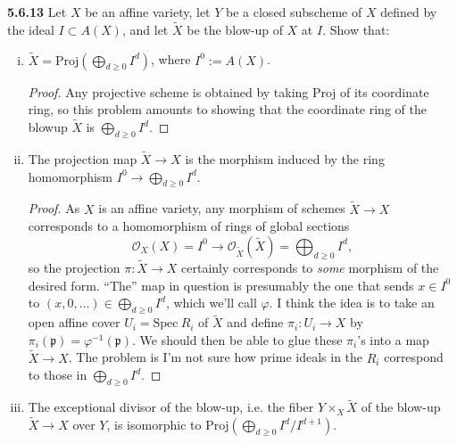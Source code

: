 \documentclass[11pt,letterpaper]{report}
\newcommand{\mcal}[1]{\mathcal{#1}}
\newcommand{\Spec}{\text{Spec}}
\newcommand{\Proj}{\text{Proj}}
\begin{document}
\noindent\textbf{5.6.13}
Let $X$ be an affine variety, let $Y$ be a closed subscheme of $X$ defined by the ideal $I\subset A(X)$, and let $\tilde{X}$ be the blow-up of $X$ at $I$. Show that:
\begin{enumerate}[(i)]
	\item $\tilde{X} = \Proj(\bigoplus_{d\geq 0}I^d)$, where $I^{0}:= A(X)$.
	\begin{proof}
		Any projective scheme is obtained by taking $\Proj$ of its coordinate ring, so this problem amounts to showing that the coordinate ring of the blowup $\tilde{X}$ is $\bigoplus_{d\geq 0}I^d$.
	\end{proof}
	\item The projection map $\tilde{X}\to X$ is the morphism induced by the ring homomorphism $I^{0}\to \bigoplus_{d\geq 0}I^{d}$.
	\begin{proof}
		As $X$ is an affine variety, any morphism of schemes $\tilde{X}\to X$ corresponds to a homomorphism of rings of global sections
		\[
		\mcal{O}_X(X) = I^0 \to \mcal{O}_{\tilde{X}}(\tilde{X}) = \bigoplus_{d\geq 0}I^d,
		\]
		so the projection $\pi: \tilde{X}\to X$ certainly corresponds to \textit{some} morphism of the desired form. ``The'' map in question is presumably the one that sends $x\in I^0$ to $(x, 0, \ldots)\in \bigoplus_{d\geq 0}I^d$, which we'll call $\varphi$. I think the idea is to take an open affine cover $U_i = \Spec\ R_i$ of $\tilde{X}$ and define $\pi_i: U_i\to X$ by $\pi_i(\mathfrak{p}) = \varphi^{-1}(\mathfrak{p})$. We should then be able to glue these $\pi_i$'s into a map $\tilde{X}\to X$. The problem is I'm not sure how prime ideals in the $R_i$ correspond to those in $\bigoplus_{d\geq 0}I^d$.
	\end{proof}
	\item The exceptional divisor of the blow-up, i.e. the fiber $Y\times_X\tilde{X}$ of the blow-up $\tilde{X}\to X$ over $Y$, is isomorphic to $\Proj(\bigoplus_{d\geq 0}I^{d}/I^{d+1})$.
\end{enumerate}
\end{document}
